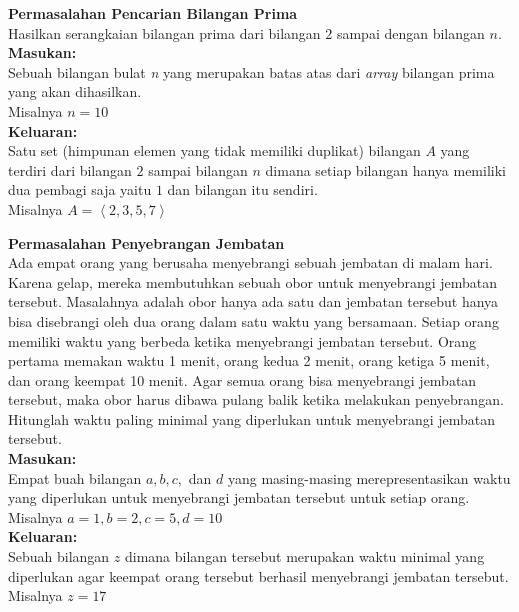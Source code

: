 \begin{contoh}
\label{cth:prima}
\textbf{Permasalahan Pencarian Bilangan Prima}\\
Hasilkan serangkaian bilangan prima dari bilangan $2$ sampai dengan bilangan $n$.\\  
\textbf{Masukan:}\\
Sebuah bilangan bulat \textit{n} yang merupakan batas atas dari \textit{array} bilangan prima yang akan dihasilkan.\\
Misalnya $n = 10$\\
\textbf{Keluaran:}\\
Satu set (himpunan elemen yang tidak memiliki duplikat) bilangan $A$ yang terdiri dari bilangan $2$ sampai bilangan $n$ dimana setiap bilangan hanya memiliki dua pembagi saja yaitu $1$ dan bilangan itu sendiri.\\
Misalnya $A = \left\langle 2,3,5,7 \right\rangle$\\
\end{contoh}

\begin{contoh}
\textbf{Permasalahan Penyebrangan Jembatan}\\
Ada empat orang yang berusaha menyebrangi sebuah jembatan di malam hari. Karena gelap, mereka membutuhkan sebuah obor untuk menyebrangi jembatan tersebut. Masalahnya adalah obor hanya ada satu dan jembatan tersebut hanya bisa disebrangi oleh dua orang dalam satu waktu yang bersamaan. Setiap orang memiliki waktu yang berbeda ketika menyebrangi jembatan tersebut. Orang pertama memakan waktu 1 menit, orang kedua 2 menit, orang ketiga 5 menit, dan orang keempat 10 menit. 
Agar semua orang bisa menyebrangi jembatan tersebut, maka obor harus dibawa pulang balik ketika melakukan penyebrangan. Hitunglah waktu paling minimal yang diperlukan untuk menyebrangi jembatan tersebut.\\
\textbf{Masukan:}\\
Empat buah bilangan $a,b,c,$ dan $d$ yang masing-masing merepresentasikan waktu yang diperlukan untuk menyebrangi jembatan tersebut untuk setiap orang.\\
Misalnya $a = 1, b = 2, c = 5, d = 10$\\
\textbf{Keluaran:}\\
Sebuah bilangan $z$ dimana bilangan tersebut merupakan waktu minimal yang diperlukan agar keempat orang tersebut berhasil menyebrangi jembatan tersebut.\\
Misalnya $z = 17$\\
\end{contoh}

